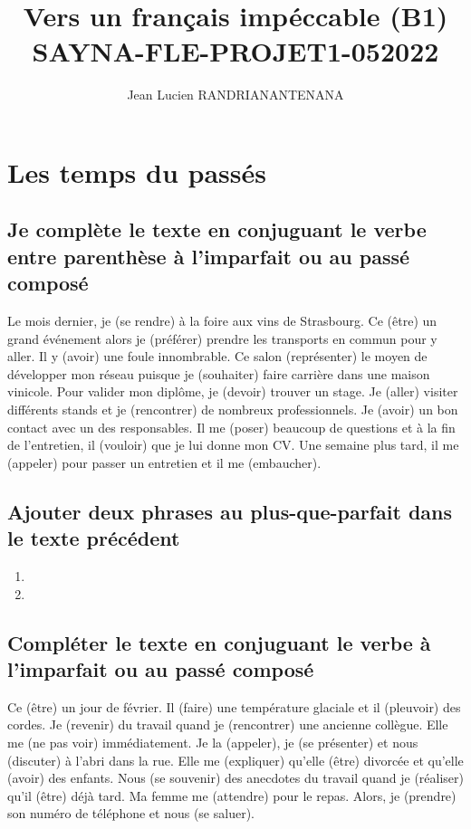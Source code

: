 \documentclass[12pt]{article}
\author{Jean Lucien RANDRIANANTENANA}
\title{Vers un français
impéccable (B1)\\SAYNA-FLE-PROJET1-052022}
\begin{document}
\maketitle

\section{Les temps du passés}
\subsection{Je complète le texte en conjuguant le verbe entre parenthèse à l'imparfait ou au passé composé}


Le mois dernier, je (se rendre) à la foire aux vins de Strasbourg. Ce (être) un grand événement
alors je (préférer) prendre les transports en commun pour y aller. Il y (avoir) une foule
innombrable. Ce salon (représenter) le moyen de développer mon réseau puisque je
(souhaiter) faire carrière dans une maison vinicole.
Pour valider mon diplôme, je (devoir) trouver un stage. Je (aller) visiter différents stands et je
(rencontrer) de nombreux professionnels. Je (avoir) un bon contact avec un des responsables.
Il me (poser) beaucoup de questions et à la fin de l’entretien, il (vouloir) que je lui donne mon
CV. Une semaine plus tard, il me (appeler) pour passer un entretien et il me (embaucher).


\subsection{Ajouter deux phrases au plus-que-parfait dans le texte précédent}
\begin{enumerate}
	\item
	\item
\end{enumerate}

\subsection{Compléter le texte en conjuguant le verbe à l’imparfait ou au passé composé}
Ce (être) un jour de février. Il (faire) une température glaciale et il (pleuvoir) des cordes.
Je (revenir) du travail quand je (rencontrer) une ancienne collègue. Elle me (ne pas voir) immédiatement.
Je la (appeler), je (se présenter) et nous (discuter) à l’abri dans la rue. 
Elle me (expliquer) qu’elle (être) divorcée et qu’elle (avoir) des enfants. Nous (se souvenir) des anecdotes du travail quand je (réaliser) qu’il (être) déjà tard.
Ma femme me (attendre) pour le repas. Alors, je (prendre) son numéro de téléphone et nous (se saluer).
\end{document}
